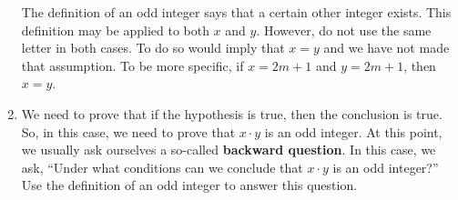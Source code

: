 \begin{previewactivity}
\begin{enumerate}
\note The definition of an odd integer says that a certain other integer exists.  This definition may be applied to both $x$ and $y$.  However, do not use the same letter in both cases.  To do so would imply that 
$x = y$ and we have not made that assumption.  To be more specific, if $x = 2m + 1$ and $y = 2m +1$, then 
$x = y$.
  \item We need to prove that if the hypothesis is true, then the conclusion is true.  So, in this case, we need to prove that $x \cdot y$ is an odd integer.  At this point, we usually ask ourselves a so-called 
\textbf{backward question}.  In this case, we ask, ``Under what conditions can we conclude that $x \cdot y$ is an odd integer?''  Use the definition of an odd integer to answer this question.%
\end{enumerate}
\hbreak
\end{previewactivity}


\endinput
